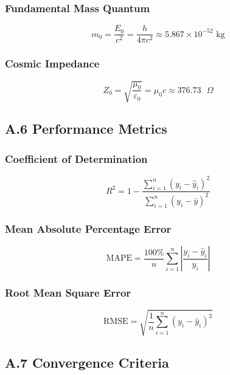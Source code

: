 \subsubsection*{Fundamental Mass Quantum}
\begin{equation}
m_0 = \frac{E_0}{c^2} = \frac{h}{4\pi c^2} \approx 5.867 \times 10^{-52} \text{ kg} \label{eq:fundamental_mass}
\end{equation}

\subsubsection*{Cosmic Impedance}
\begin{equation}
Z_0 = \sqrt{\frac{\mu_0}{\varepsilon_0}} = \mu_0 c \approx 376.73 \text{ }\Omega \label{eq:cosmic_impedance}
\end{equation}

\subsection*{A.6 Performance Metrics}

\subsubsection*{Coefficient of Determination}
\begin{equation}
R^2 = 1 - \frac{\sum_{i=1}^n (y_i - \hat{y}_i)^2}{\sum_{i=1}^n (y_i - \bar{y})^2} \label{eq:r_squared}
\end{equation}

\subsubsection*{Mean Absolute Percentage Error}
\begin{equation}
\text{MAPE} = \frac{100\%}{n} \sum_{i=1}^n \left|\frac{y_i - \hat{y}_i}{y_i}\right| \label{eq:mape}
\end{equation}

\subsubsection*{Root Mean Square Error}
\begin{equation}
\text{RMSE} = \sqrt{\frac{1}{n} \sum_{i=1}^n (y_i - \hat{y}_i)^2} \label{eq:rmse}
\end{equation}

\subsection*{A.7 Convergence Criteria}

